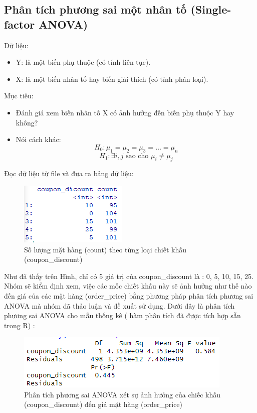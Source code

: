 \subsection{Phân tích phương sai một nhân tố (Single-factor ANOVA)}

Dữ liệu:
\begin{itemize}
    \item Y: là một biến phụ thuộc (có tính liên tục).
    \item X: là một biến nhân tố hay biến giải thích (có tính phân loại).
\end{itemize}

Mục tiêu:
\begin{itemize}
    \item Đánh giá xem biến nhân tố X có ảnh hưởng đến biến phụ thuộc Y hay không?
    \item Nói cách khác:
    \[
        H_{0}: \mu_{1} = \mu_{2} = \mu_{3} = \dots = \mu_{n}
        \]
        \[
        H_{1}: \exists i, j \text{ sao cho } \mu_{i} \neq \mu_{j}
        \]
\end{itemize}
Đọc dữ liệu từ file và đưa ra bảng dữ liệu:
\begin{figure}[!htbp]
    \centering
    \includegraphics[width=0.4\linewidth]{graphics/5.3.1.png}
    \caption{Số lượng mặt hàng (count) theo từng loại chiết khấu (coupon\_discount)}
\end{figure}

Như đã thấy trên Hình, chỉ có 5 giá trị của coupon\_discount là : 0, 5, 10, 15, 25. Nhóm sẽ kiểm định xem, việc các mốc chiết khấu này sẽ ảnh hưởng như thế nào đến giá của các mặt hàng (order\_price) bằng phương pháp phân tích phương sai ANOVA mà nhóm đã thảo luận và đề xuất sử dụng. Dưới đây là phân tích phương sai ANOVA cho mẫu thống kê ( hàm phân tích đã được tích hợp sẵn trong R) :

\begin{figure}[!htbp]
    \centering
    \includegraphics[width=0.4\linewidth]{graphics/5.3.2.png}
    \caption{Phân tích phương sai ANOVA xét sự ảnh hưởng của chiếc khấu (coupon\_discount) đến giá mặt hàng (order\_price)}
\end{figure}

